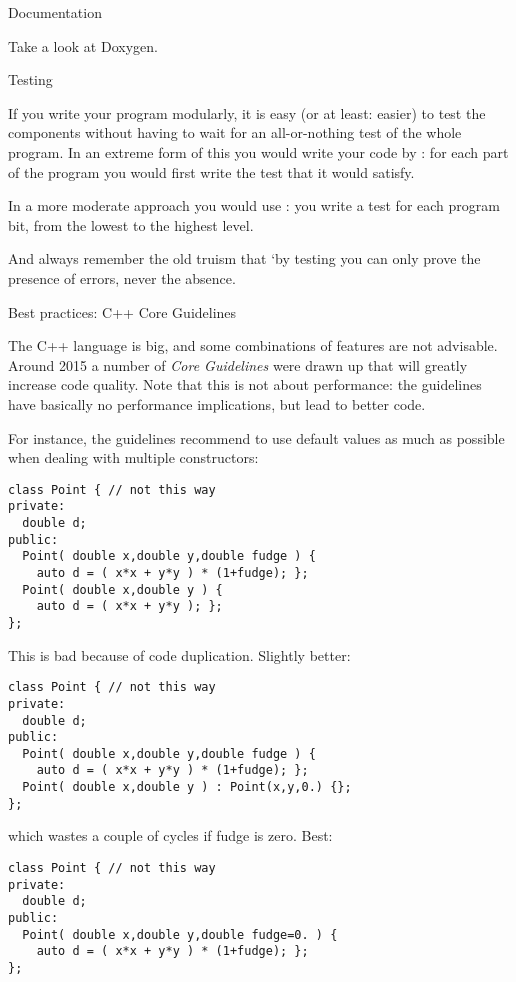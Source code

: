  {Documentation}

Take a look at Doxygen.

 {Testing}

If you write your program modularly, it is easy (or at least: easier)
to test the components without having to wait for an all-or-nothing
test of the whole program. In an extreme form of this you would write
your code by : for each part of the
program you would first write the test that it would satisfy.

In a more moderate approach you would use :
you write a test for each program bit, from the lowest to the highest
level.

And always remember the old truism that `by testing you can only prove
the presence of errors, never the absence.

 {Best practices: C++ Core Guidelines}

The C++ language is big, and some combinations of features are not
advisable. Around 2015 a number of \emph{Core Guidelines} were drawn
up that will greatly increase code quality. Note that this is not
about performance: the guidelines have basically no performance
implications, but lead to better code.

For instance, the guidelines recommend to use default values as much
as possible when dealing with multiple constructors:
\begin{lstlisting}
class Point { // not this way
private:
  double d;
public:
  Point( double x,double y,double fudge ) {
    auto d = ( x*x + y*y ) * (1+fudge); };
  Point( double x,double y ) {
    auto d = ( x*x + y*y ); };
};
\end{lstlisting}
This is bad because of code duplication. Slightly better:
\begin{lstlisting}
class Point { // not this way
private:
  double d;
public:
  Point( double x,double y,double fudge ) {
    auto d = ( x*x + y*y ) * (1+fudge); };
  Point( double x,double y ) : Point(x,y,0.) {};
};
\end{lstlisting}
which wastes a couple of cycles if fudge is zero.
Best:
\begin{lstlisting}
class Point { // not this way
private:
  double d;
public:
  Point( double x,double y,double fudge=0. ) {
    auto d = ( x*x + y*y ) * (1+fudge); };
};
\end{lstlisting}


